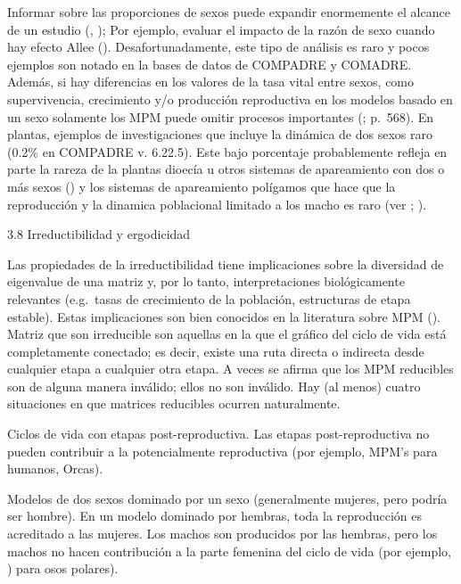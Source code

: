 \documentclass[
]{book}
\theoremstyle{definition}
\theoremstyle{definition}
\theoremstyle{definition}
\theoremstyle{definition}
\theoremstyle{remark}
\begin{document}
Informar sobre las proporciones de sexos puede expandir enormemente el alcance de un estudio (\citet{shyu2016demographic}, \citet{shyu2016frequency}); Por ejemplo, evaluar el impacto de la razón de sexo cuando hay efecto Allee (\citet{boukal2002single}). Desafortunadamente, este tipo de análisis es raro y pocos ejemplos son notado en la bases de datos de COMPADRE y COMADRE. Además, si hay diferencias en los valores de la tasa vital entre sexos, como supervivencia, crecimiento y/o producción reproductiva en los modelos basado en un sexo solamente los MPM puede omitir procesos importantes (\citet{archer2022sex}; \citet{caswell2001matrix} p.~568). En plantas, ejemplos de investigaciones que incluye la dinámica de dos sexos raro (0.2\% en COMPADRE v. 6.22.5). Este bajo porcentaje probablemente refleja en parte la rareza de la plantas dioecía u otros sistemas de apareamiento con dos o más sexos (\citet{gabriel2017rarity}) y los sistemas de apareamiento polígamos que hace que la reproducción y la dinamica poblacional limitado a los macho es raro (ver \citet{compagnoni2017can}; \citet{miller2022two}).

3.8 \textbar{} Irreductibilidad y ergodicidad

Las propiedades de la irreductibilidad tiene implicaciones sobre la diversidad de eigenvalue de una matriz y, por lo tanto, interpretaciones biológicamente relevantes (e.g.~tasas de crecimiento de la población, estructuras de etapa estable). Estas implicaciones son bien conocidos en la literatura sobre MPM (\citet{caswell2001matrix}). Matriz que son irreducible son aquellas en la que el gráfico del ciclo de vida está completamente conectado; es decir, existe una ruta directa o indirecta desde cualquier etapa a cualquier otra etapa. A veces se afirma que los MPM reducibles son de alguna manera inválido; ellos no son inválido. Hay (al menos) cuatro situaciones en que matrices reducibles ocurren naturalmente.

Ciclos de vida con etapas post-reproductiva. Las etapas post-reproductiva no pueden contribuir a la potencialmente reproductiva (por ejemplo, MPM's para humanos, Orcas).

Modelos de dos sexos dominado por un sexo (generalmente mujeres, pero podría ser hombre). En un modelo dominado por hembras, toda la reproducción es acreditado a las mujeres. Los machos son producidos por las hembras, pero los machos no hacen contribución a la parte femenina del ciclo de vida (por ejemplo, \citet{hunter2010climate}) para osos polares).
\end{document}
